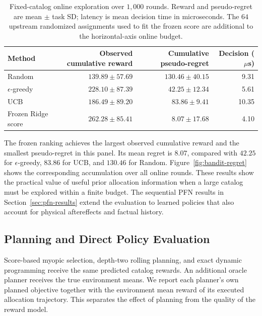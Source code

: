\documentclass[a4paper,11pt]{article}
\numberwithin{equation}{section}
\begin{document}
\begin{table}[htbp]
\centering\small
\caption{Fixed-catalog online exploration over $1{,}000$ rounds. Reward and pseudo-regret are mean $\pm$ task SD; latency is mean decision time in microseconds. The $64$ upstream randomized assignments used to fit the frozen score are additional to the horizontal-axis online budget.}
\label{tab:bandit-results}
\begin{tabular*}{\textwidth}{@{\extracolsep{\fill}}lrrr@{}}
\toprule Method & Observed cumulative reward & Cumulative pseudo-regret & Decision ($\mu$s)\\\midrule
Random & $139.89\pm57.69$ & $130.46\pm40.15$ & 9.31\\
$\epsilon$-greedy & $228.10\pm87.39$ & $42.25\pm12.34$ & 5.61\\
UCB & $186.49\pm89.20$ & $83.86\pm9.41$ & 10.35\\
Frozen Ridge score & $262.28\pm85.41$ & $8.07\pm17.68$ & 4.10\\
\bottomrule
\end{tabular*}
\end{table}

The frozen ranking achieves the largest observed cumulative reward and the smallest pseudo-regret in this panel. Its mean regret is $8.07$, compared with $42.25$ for $\epsilon$-greedy, $83.86$ for UCB, and $130.46$ for Random. Figure~\ref{fig:bandit-regret} shows the corresponding accumulation over all online rounds. These results show the practical value of useful prior allocation information when a large catalog must be explored within a finite budget. The sequential PFN results in Section~\ref{sec:pfn-results} extend the evaluation to learned policies that also account for physical aftereffects and factual history.

\FloatBarrier
\subsection{Planning and Direct Policy Evaluation}
\label{sec:planning-results}
Score-based myopic selection, depth-two rolling planning, and exact dynamic programming receive the same predicted catalog rewards. An additional oracle planner receives the true environment means. We report each planner's own planned objective together with the environment mean reward of its executed allocation trajectory. This separates the effect of planning from the quality of the reward model.
\end{document}
